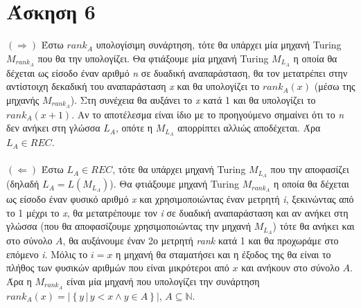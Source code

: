 \documentclass[11pt]{article}
\begin{document}


\section*{Άσκηση 6}
$(\Rightarrow)$ Έστω $rank_A$ υπολογίσιμη συνάρτηση, τότε θα υπάρχει μία μηχανή Turing $M_{rank_A}$ που θα την υπολογίζει. Θα φτιάξουμε μία μηχανή Turing $M_{L_A}$ η οποία θα δέχεται ως είσοδο έναν αριθμό \textit{n} σε δυαδική αναπαράσταση, θα τον μετατρέπει στην αντίστοιχη δεκαδική του αναπαράσταση \textit{x} και θα υπολογίζει το $rank_A(x)$ (μέσω της μηχανής $M_{rank_A}$). Στη συνέχεια θα αυξάνει το \textit{x} κατά 1 και θα υπολογίζει το $rank_A(x + 1)$. Αν το αποτέλεσμα είναι ίδιο με το προηγούμενο σημαίνει ότι το \textit{n} δεν ανήκει στη γλώσσα $L_A$, οπότε η $M_{L_A}$ απορρίπτει αλλιώς αποδέχεται. Άρα $L_A \in REC$.
\\
\\
$(\Leftarrow)$ Έστω $L_A \in REC$, τότε θα υπάρχει μηχανή Turing $M_{L_A}$ που την αποφασίζει (δηλαδή $L_A = L(M_{L_A})$). Θα φτιάξουμε μηχανή Turing $M_{rank_A}$ η οποία θα δέχεται ως είσοδο έναν φυσικό αριθμό \textit{x} και χρησιμοποιώντας έναν μετρητή \textit{i}, ξεκινώντας από το 1 μέχρι το \textit{x}, θα μετατρέπουμε τον \textit{i} σε δυαδική αναπαράσταση και αν ανήκει στη γλώσσα (που θα αποφασίζουμε χρησιμοποιώντας την μηχανή $M_{L_A}$) τότε θα ανήκει και στο σύνολο $A$, θα αυξάνουμε έναν 2ο μετρητή \textit{rank} κατά 1 και θα προχωράμε στο επόμενο \textit{i}. Μόλις το $i = x$ η μηχανή θα σταματήσει και η έξοδος της θα είναι το πλήθος των φυσικών αριθμών που είναι μικρότεροι από $x$ και ανήκουν στο σύνολο $A$. Άρα η $M_{rank_A}$ είναι μία μηχανή που υπολογίζει την συνάρτηση $rank_A(x) = |\left\lbrace y \, | \, y < x \land y \in A \right\rbrace |$, $A \subseteq \mathbb{N}$.




\end{document}
